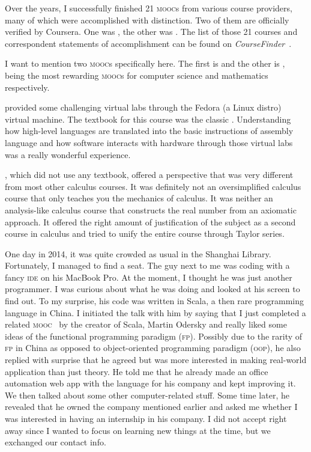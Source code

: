 	Over the years, I successfully finished 21 \textsc{mooc}s from various
	course providers, many of which were accomplished with distinction. Two of them
	are officially verified by Coursera. One was , the other
	was . The list of those 21 courses and correspondent
	statements of accomplishment can be found on
	\textit{CourseFinder}~\cite{accredible}.
	
	I want to mention two \textsc{mooc}s specifically here. The first is
	 and the other is , being the most rewarding
	\textsc{mooc}s for computer science and mathematics respectively.
	
	 provided some challenging virtual labs through the Fedora (a
	Linux distro) virtual machine. The textbook for this course was the classic
	\textcite{CSAPP}. Understanding how high-level languages are translated
	into the basic instructions of assembly language and how software interacts
	with hardware through those virtual labs was a really wonderful experience.

	, which did not use any textbook, offered a perspective that was
	very different from most other calculus courses. It was definitely not an
	oversimplified calculus course that only teaches you the mechanics of calculus.
	It was neither an analysis-like calculus course that constructs the real number
	from an axiomatic approach. It offered the right amount of justification of the
	subject as a second course in calculus and tried to unify the entire course
	through Taylor series.
	
	One day in 2014, it was quite crowded as usual in the Shanghai Library.
	Fortunately, I managed to find a seat. The guy next to me was coding with a
	fancy \textsc{ide} on his MacBook Pro. At the moment, I thought he was just
	another programmer. I was curious about what he was doing and looked at his
	screen to find out. To my surprise, his code was written in Scala, a then rare
	programming language in China. I initiated the talk with him by saying that I
	just completed a related \textsc{mooc}~\cite{FPPS} by the creator of Scala,
	Martin Odersky and really liked some ideas of the functional programming
	paradigm (\textsc{fp}). Possibly due to the rarity of \textsc{fp} in China as
	opposed to object-oriented programming paradigm (\textsc{oop}), he also replied
	with surprise that he agreed but was more interested in making real-world
	application than just theory. He told me that he already made an office
	automation web app with the language for his company and kept improving it. We
	then talked about some other computer-related stuff. Some time later, he
	revealed that he owned the company mentioned earlier and asked me whether I was
	interested in having an internship in his company. I did not accept right away
	since I wanted to focus on learning new things at the time, but we exchanged
	our contact info.
	
